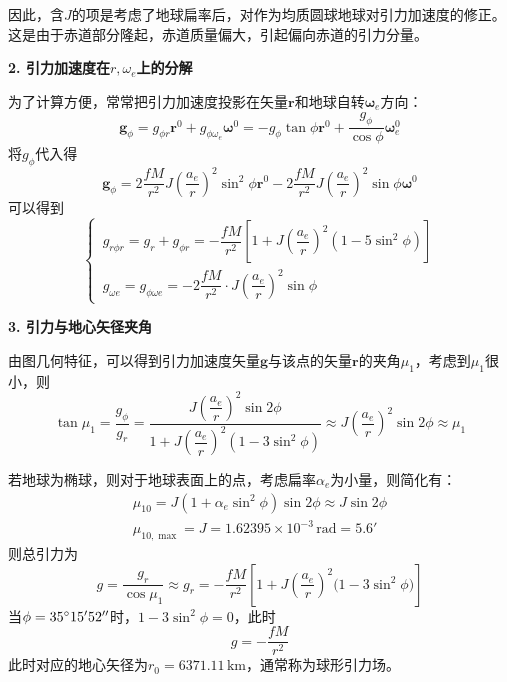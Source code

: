 因此，含$J$的项是考虑了地球扁率后，对作为均质圆球地球对引力加速度的修正。这是由于赤道部分隆起，赤道质量偏大，引起偏向赤道的引力分量。
\vspace*{1em}

\noindent \textbf{2. 引力加速度在$r, \omega_e$上的分解}

为了计算方便，常常把引力加速度投影在矢量$\bm{r}$和地球自转$\bm{\omega}_e$方向：
\begin{equation}
	\bm{g}_\phi = g_{\phi r} \bm{r}^0 + g_{\phi \omega_e} \bm{\omega}^0 = - g_\phi \tan \phi \bm{r}^0 + \dfrac{g_\phi}{\cos \phi} \bm{\omega}_e^0
\end{equation}
将$g_\phi$代入得
\begin{equation}
	\bm{g}_\phi = 2 \dfrac{fM}{r^2}J\left(\dfrac{a_e}{r}\right)^2 \sin^2 \phi \bm{r}^0 - 2 \dfrac{fM}{r^2}J\left(\dfrac{a_e}{r}\right)^2 \sin \phi \bm{\omega}^0
\end{equation}
可以得到
\begin{equation}
	\begin{cases}
		\, g_{r \phi r} = g_r + g_{\phi r} = -\dfrac{fM}{r^2}\left[1 + J \left(\dfrac{a_e}{r}\right)^2(1 - 5\sin^2 \phi)\right]\\[0.8em]
		\, g_{\omega e} = g_{\phi \omega e} = - 2 \dfrac{fM}{r^2}\cdot J\left(\dfrac{a_e}{r}\right)^2\sin \phi
	\end{cases}
\end{equation}

\noindent \textbf{3. 引力与地心矢径夹角}

由图几何特征，可以得到引力加速度矢量$\bm{g}$与该点的矢量$\bm{r}$的夹角$\mu_1$，考虑到$\mu_1$很小，则
\begin{equation}
	\tan \mu_1 = \dfrac{g_\phi}{g_r} = \dfrac{J \left(\dfrac{a_e}{r}\right)^2\sin 2\phi}{1 + J \left(\dfrac{a_e}{r}\right)^2(1 - 3 \sin^2 \phi)} \approx J \left(\dfrac{a_e}{r}\right)^2\sin 2\phi \approx \mu_1
\end{equation}

若地球为椭球，则对于地球表面上的点，考虑扁率$\alpha_e$为小量，则简化有：
\begin{equation}
	\begin{aligned}
		\mu_{10} = J (1 + \alpha_e \sin^2 \phi)\sin 2\phi  \approx J \sin 2\phi \\
		\mu_{10,\max} = J = 1.62395 \times 10^{-3} \, \text{rad} = 5.6' 
	\end{aligned}
\end{equation}
则总引力为
\begin{equation}
	g = \dfrac{g_r}{\cos \mu_1} \approx g_r = -\dfrac{fM}{r^2}\left[1+J \left(\dfrac{a_e}{r}\right)^2\big(1 - 3 \sin^2 \phi\big)\right]
\end{equation}
当$\phi = 35{}^{\circ}15'52''$时，$1 - 3 \sin^2 \phi = 0$，此时
\begin{equation}
	g = -\dfrac{fM}{r^2}
\end{equation}
此时对应的地心矢径为$r_0 = 6371.11\,\text{km}$，通常称为球形引力场。
\vspace*{1em}

